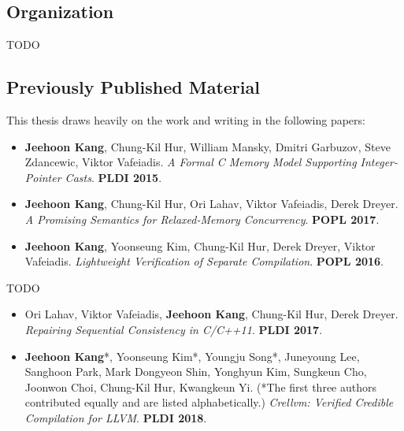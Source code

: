 \subsection{Organization}

TODO


\subsection{Previously Published Material}

This thesis draws heavily on the work and writing in the following papers:

\begin{itemize}
\item[\cite{intptrcast}] \textbf{Jeehoon Kang}, Chung-Kil Hur, William Mansky, Dmitri Garbuzov,
  Steve Zdancewic, Viktor Vafeiadis.  \emph{A Formal C Memory Model Supporting Integer-Pointer
    Casts}.  \textbf{PLDI 2015}.
\item[\cite{promising}] \textbf{Jeehoon Kang}, Chung-Kil Hur, Ori Lahav, Viktor Vafeiadis, Derek
  Dreyer.  \emph{A Promising Semantics for Relaxed-Memory Concurrency}.  \textbf{POPL 2017}.
\item[\cite{sepcomp}] \textbf{Jeehoon Kang}, Yoonseung Kim, Chung-Kil Hur, Derek Dreyer, Viktor
  Vafeiadis.  \emph{Lightweight Verification of Separate Compilation}.  \textbf{POPL 2016}.
\end{itemize}

TODO

\begin{itemize}
\item[\cite{scfix}] Ori Lahav, Viktor Vafeiadis, \textbf{Jeehoon Kang}, Chung-Kil Hur, Derek Dreyer.
  \emph{Repairing Sequential Consistency in C/C++11}.  \textbf{PLDI 2017}.
\item[\cite{crellvm}] \textbf{Jeehoon Kang}*, Yoonseung Kim*, Youngju Song*, Juneyoung Lee, Sanghoon
  Park, Mark Dongyeon Shin, Yonghyun Kim, Sungkeun Cho, Joonwon Choi, Chung-Kil Hur, Kwangkeun Yi.
  (*The first three authors contributed equally and are listed alphabetically.)  \emph{Crellvm:
    Verified Credible Compilation for LLVM}.  \textbf{PLDI 2018}.
\end{itemize}


